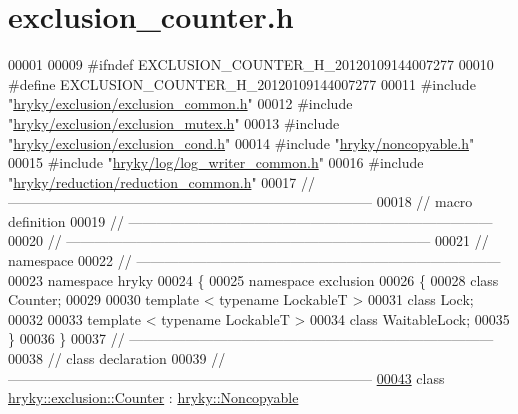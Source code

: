 \hypertarget{exclusion__counter_8h_source}{\section{exclusion\-\_\-counter.\-h}
}

\begin{DoxyCode}
00001 
00009 \textcolor{preprocessor}{#ifndef EXCLUSION\_COUNTER\_H\_20120109144007277}
00010 \textcolor{preprocessor}{}\textcolor{preprocessor}{#define EXCLUSION\_COUNTER\_H\_20120109144007277}
00011 \textcolor{preprocessor}{}\textcolor{preprocessor}{#include "\hyperlink{exclusion__common_8h}{hryky/exclusion/exclusion_common.h}"}
00012 \textcolor{preprocessor}{#include "\hyperlink{exclusion__mutex_8h}{hryky/exclusion/exclusion_mutex.h}"}
00013 \textcolor{preprocessor}{#include "\hyperlink{exclusion__cond_8h}{hryky/exclusion/exclusion_cond.h}"}
00014 \textcolor{preprocessor}{#include "\hyperlink{noncopyable_8h}{hryky/noncopyable.h}"}
00015 \textcolor{preprocessor}{#include "\hyperlink{log__writer__common_8h}{hryky/log/log_writer_common.h}"}
00016 \textcolor{preprocessor}{#include "\hyperlink{reduction__common_8h}{hryky/reduction/reduction_common.h}"}
00017 \textcolor{comment}{//
      ------------------------------------------------------------------------------}
00018 \textcolor{comment}{// macro definition}
00019 \textcolor{comment}{//
      ------------------------------------------------------------------------------}
00020 \textcolor{comment}{//
      ------------------------------------------------------------------------------}
00021 \textcolor{comment}{// namespace}
00022 \textcolor{comment}{//
      ------------------------------------------------------------------------------}
00023 \textcolor{keyword}{namespace }hryky
00024 \{
00025 \textcolor{keyword}{namespace }exclusion
00026 \{
00028     \textcolor{keyword}{class }Counter;
00029 
00030     \textcolor{keyword}{template} < \textcolor{keyword}{typename} LockableT >
00031     \textcolor{keyword}{class }Lock;
00032     
00033     \textcolor{keyword}{template} < \textcolor{keyword}{typename} LockableT >
00034     \textcolor{keyword}{class }WaitableLock;
00035 \}
00036 \}
00037 \textcolor{comment}{//
      ------------------------------------------------------------------------------}
00038 \textcolor{comment}{// class declaration}
00039 \textcolor{comment}{//
      ------------------------------------------------------------------------------}
\hypertarget{exclusion__counter_8h_source_l00043}{}\hyperlink{classhryky_1_1exclusion_1_1_counter}{00043} \textcolor{comment}{}\textcolor{keyword}{class }\hyperlink{classhryky_1_1exclusion_1_1_counter}{hryky::exclusion::Counter} : \hyperlink{classhryky_1_1_noncopyable}{hryky::Noncopyable}

\end{DoxyCode}
